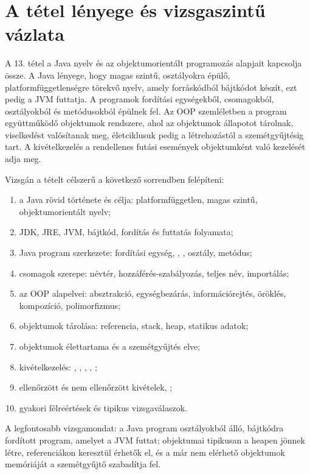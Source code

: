 \section{A tétel lényege és vizsgaszintű vázlata}

\begin{summarybox}
A 13. tétel a Java nyelv és az objektumorientált programozás alapjait kapcsolja össze. A Java lényege, hogy magas szintű, osztályokra épülő, platformfüggetlenségre törekvő nyelv, amely forráskódból bájtkódot készít, ezt pedig a JVM futtatja. A programok fordítási egységekből, csomagokból, osztályokból és metódusokból épülnek fel. Az OOP szemléletben a program együttműködő objektumok rendszere, ahol az objektumok állapotot tárolnak, viselkedést valósítanak meg, életciklusuk pedig a létrehozástól a szemétgyűjtésig tart. A kivételkezelés a rendellenes futási események objektumként való kezelését adja meg.
\end{summarybox}

Vizsgán a tételt célszerű a következő sorrendben felépíteni:

\begin{enumerate}
  \item a Java rövid története és célja: platformfüggetlen, magas szintű, objektumorientált nyelv;
  \item JDK, JRE, JVM, bájtkód, fordítás és futtatás folyamata;
  \item Java program szerkezete: fordítási egység, , , osztály,  metódus;
  \item csomagok szerepe: névtér, hozzáférés-szabályozás, teljes név, importálás;
  \item az OOP alapelvei: absztrakció, egységbezárás, információrejtés, öröklés, kompozíció, polimorfizmus;
  \item objektumok tárolása: referencia, stack, heap, statikus adatok;
  \item objektumok élettartama és a szemétgyűjtés elve;
  \item kivételkezelés: , , , , ;
  \item ellenőrzött és nem ellenőrzött kivételek, ;
  \item gyakori félreértések és tipikus vizsgaválaszok.
\end{enumerate}

A legfontosabb vizsgamondat: a Java program osztályokból álló, bájtkódra fordított program, amelyet a JVM futtat; objektumai tipikusan a heapen jönnek létre, referenciákon keresztül érhetők el, és a már nem elérhető objektumok memóriáját a szemétgyűjtő szabadítja fel.

